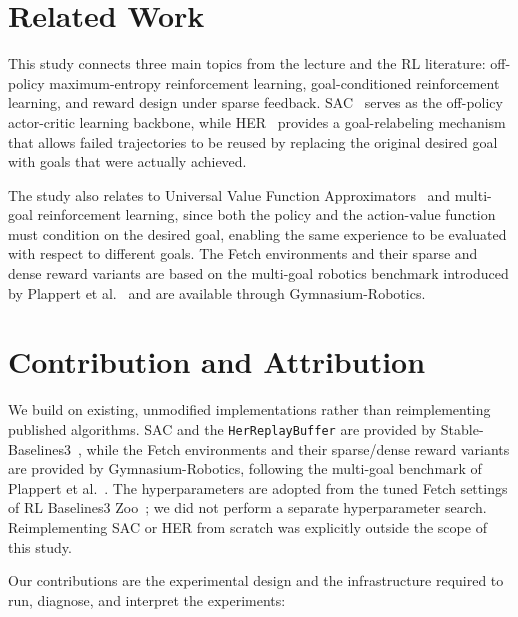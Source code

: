 \documentclass{article}
\begin{document}
\section{Related Work}

This study connects three main topics from the lecture and the RL literature:
off-policy maximum-entropy reinforcement learning, goal-conditioned
reinforcement learning, and reward design under sparse feedback.
SAC~\cite{haarnoja18} serves as the off-policy actor-critic learning backbone,
while HER~\cite{andrychowicz17} provides a goal-relabeling mechanism that
allows failed trajectories to be reused by replacing the original desired goal
with goals that were actually achieved.

The study also relates to Universal Value Function
Approximators~\cite{schaul15} and multi-goal reinforcement learning, since both
the policy and the action-value function must condition on the desired goal,
enabling the same experience to be evaluated with respect to different goals.
The Fetch environments and their sparse and dense reward variants are based on
the multi-goal robotics benchmark introduced by Plappert et
al.~\cite{plappert18} and are available through Gymnasium-Robotics.

\section{Contribution and Attribution}
\label{sec:contribution}

We build on existing, unmodified implementations rather than reimplementing
published algorithms. SAC and the \texttt{HerReplayBuffer} are provided by
Stable-Baselines3~\cite{raffin21sb3}, while the Fetch environments and their
sparse/dense reward variants are provided by Gymnasium-Robotics, following the
multi-goal benchmark of Plappert et al.~\cite{plappert18}. The hyperparameters
are adopted from the tuned Fetch settings of RL Baselines3
Zoo~\cite{raffin20zoo}; we did not perform a separate hyperparameter search.
Reimplementing SAC or HER from scratch was explicitly outside the scope of
this study.

Our contributions are the experimental design and the infrastructure required
to run, diagnose, and interpret the experiments:
\end{document}
